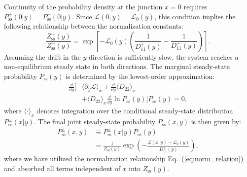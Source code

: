 \documentclass[aps,prx,reprint,superscriptaddress,longbibliography,nofootinbib,floatfix]{revtex4-2}
\begin{document}
Continuity of the probability density at the junction $x=0$ requires $P_{\mathrm{ss}}^+(0|y) = P_{\mathrm{ss}}^-(0|y)$. Since $\mathcal{L}(0, y) = \mathcal{L}_0(y)$, this condition implies the following relationship between the normalization constants:
\begin{equation} \label{eq:norm_relation}
\frac{Z_{\mathrm{ss}}^{+}(y)}{Z_{\mathrm{ss}}^{-}(y)}
= \exp\left[
-\mathcal{L}_{0}(y)\left( \frac{1}{D_{11}^{+}(y)} - \frac{1}{D_{11}^{-}(y)} \right)
\right].
\end{equation}
Assuming the drift in the $y$-direction is sufficiently slow, the system reaches a non-equilibrium steady state in both directions. The marginal steady-state probability $P_{\mathrm{ss}}(y)$ is determined by the lowest-order approximation:
\begin{equation}
\begin{split}
    \frac{\dd}{\dd y}\bigg[&\langle \partial_y \mathcal{L} \rangle_x+\frac{\dd}{\dd y} \langle D_{22} \rangle_x \\
    &+\langle D_{22}\rangle_x \frac{\dd}{\dd y} \ln P_{\mathrm{ss}}(y)\bigg] P_{\mathrm{ss}}(y)=0,
\end{split}
\end{equation}
where $\langle \cdot \rangle_x$ denotes integration over the conditional steady-state distribution $P_{\mathrm{ss}}^{\pm}(x|y)$. The final joint steady-state probability $P_{\mathrm{ss}}(x,y)$ is then given by:
\begin{equation}
\begin{split}
    P_{\mathrm{ss}}^{\pm}(x,y)&\equiv P_{\mathrm{ss}}^{\pm}(x|y)P_{\mathrm{ss}}(y) \\
    &=\frac{1}{Z_{\mathrm{ss}}(y)} \exp \left( - \frac{\mathcal{L}(x,y)-\mathcal{L}_{0}(y)}{D_{11}^{\pm}(y)} \right),
\end{split}
\end{equation}
where we have utilized the normalization relationship Eq.~(\ref{eq:norm_relation}) and absorbed all terms independent of $x$ into $Z_{\mathrm{ss}}(y)$.
\end{document}
